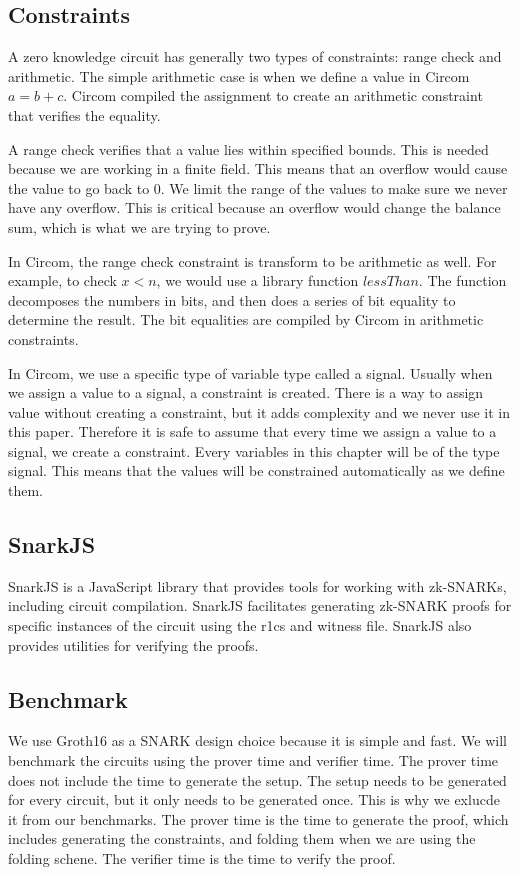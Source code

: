 \subsection{Constraints} 

A zero knowledge circuit has generally two types of constraints: range check and arithmetic.
The simple arithmetic case is when we define a value in Circom $a = b + c$. Circom compiled the assignment to create an arithmetic constraint that verifies the equality.

A range check verifies that a value lies within specified bounds. This is needed because we are working in a finite field. This means that an overflow would cause the value to go back to 0.
We limit the range of the values to make sure we never have any overflow. This is critical because an overflow would change the balance sum, which is what we are trying to prove.

In Circom, the range check constraint is transform to be arithmetic as well. For example, to check $x<n$, we would use a library function $lessThan$.
The function decomposes the numbers in bits, and then does a series of bit equality to determine the result. The bit equalities are compiled by Circom in arithmetic constraints.

In Circom, we use a specific type of variable type called a signal. Usually when we assign a value to a signal, a constraint is created.
There is a way to assign value without creating a constraint, but it adds complexity and we never use it in this paper. 
Therefore it is safe to assume that every time we assign a value to a signal, we create a constraint. 
Every variables in this chapter will be of the type signal.
This means that the values will be constrained automatically as we define them. 


\subsection{SnarkJS} 

SnarkJS is a JavaScript library that provides tools for working with zk-SNARKs, including circuit compilation.
SnarkJS facilitates generating zk-SNARK proofs for specific instances of the circuit using the r1cs and witness file.
SnarkJS also provides utilities for verifying the proofs.

\subsection{Benchmark} 
We use Groth16 as a SNARK design choice because it is simple and fast. 
We will benchmark the circuits using the prover time and verifier time. The prover time does not include the time to generate the setup.
The setup needs to be generated for every circuit, but it only needs to be generated once. This is why we exlucde it from our benchmarks.
The prover time is the time to generate the proof, which includes generating the constraints, and folding them when we are using the folding schene. 
The verifier time is the time to verify the proof.

